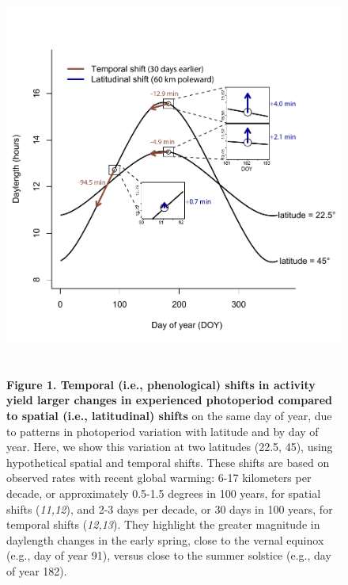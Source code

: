 \documentclass[10.5pt,a4paper]{letter}
\begin{document}
\begin{letter}{}
\begin{footnotesize}

\begin{figure}
\centering
\includegraphics[scale=.6]{..//..//..//analyses/photoperiod/figures/photo_spacetime_v2a.pdf} %
\caption{\textbf{
\\\\Figure 1. Temporal (i.e., phenological) shifts in activity yield larger changes in experienced photoperiod compared to spatial (i.e., latitudinal) shifts} on the same day of year, due to patterns in photoperiod variation with latitude and by day of year. Here, we show this variation at two latitudes (22.5\degree, 45\degree), using hypothetical spatial and temporal shifts. These shifts are based on observed rates with recent global warming: 6-17 kilometers per decade, or approximately 0.5-1.5 degrees in 100 years, for spatial shifts (\emph{11,12}), and 2-3 days per decade, or 30 days in 100 years, for temporal shifts (\emph{12,13}). They highlight the greater magnitude in daylength changes in the early spring, close to the vernal equinox (e.g., day of year 91), versus close to the summer solstice (e.g., day of year 182).}
 \label{fig:spacetime}%
 \end{figure}
 

\end{footnotesize}
\end{letter}
\end{document}
